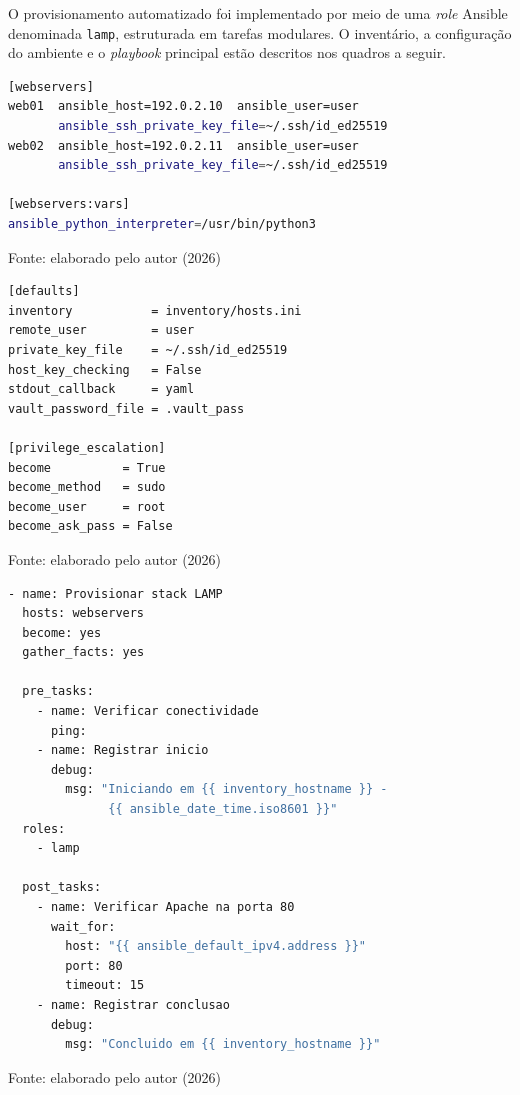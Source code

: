\documentclass[12pt]{article}
\newenvironment{quadro}[1][H]
  {\begin{table}[#1]\centering}
  {\end{table}}
\newcommand{\fonte}[1]{%
  \begin{flushleft}
    \footnotesize Fonte: #1
  \end{flushleft}%
}
\begin{document}
O provisionamento automatizado foi implementado por meio de uma \textit{role}
Ansible denominada \texttt{lamp}, estruturada em tarefas modulares. O
inventário, a configuração do ambiente e o \textit{playbook} principal estão
descritos nos quadros a seguir.

\begin{quadro}[H]
  \caption{Inventário Ansible -- \texttt{hosts.ini}}
  \label{quad:hosts}
  \begin{lstlisting}[language=bash]
[webservers]
web01  ansible_host=192.0.2.10  ansible_user=user
       ansible_ssh_private_key_file=~/.ssh/id_ed25519
web02  ansible_host=192.0.2.11  ansible_user=user
       ansible_ssh_private_key_file=~/.ssh/id_ed25519

[webservers:vars]
ansible_python_interpreter=/usr/bin/python3
  \end{lstlisting}
  \fonte{elaborado pelo autor (2026)}
\end{quadro}

\begin{quadro}[H]
  \caption{Configuração do ambiente Ansible -- \texttt{ansible.cfg}}
  \label{quad:ansiblecfg}
  \begin{lstlisting}[language=bash]
[defaults]
inventory           = inventory/hosts.ini
remote_user         = user
private_key_file    = ~/.ssh/id_ed25519
host_key_checking   = False
stdout_callback     = yaml
vault_password_file = .vault_pass

[privilege_escalation]
become          = True
become_method   = sudo
become_user     = root
become_ask_pass = False
  \end{lstlisting}
  \fonte{elaborado pelo autor (2026)}
\end{quadro}

\begin{quadro}[H]
  \caption{\textit{Playbook} principal de provisionamento -- \texttt{site.yml}}
  \label{quad:siteyml}
  \begin{lstlisting}[language=bash]
- name: Provisionar stack LAMP
  hosts: webservers
  become: yes
  gather_facts: yes

  pre_tasks:
    - name: Verificar conectividade
      ping:
    - name: Registrar inicio
      debug:
        msg: "Iniciando em {{ inventory_hostname }} -
              {{ ansible_date_time.iso8601 }}"
  roles:
    - lamp

  post_tasks:
    - name: Verificar Apache na porta 80
      wait_for:
        host: "{{ ansible_default_ipv4.address }}"
        port: 80
        timeout: 15
    - name: Registrar conclusao
      debug:
        msg: "Concluido em {{ inventory_hostname }}"
  \end{lstlisting}
  \fonte{elaborado pelo autor (2026)}
\end{quadro}
\end{document}

